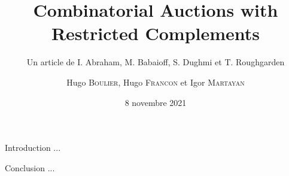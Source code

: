 \documentclass[aspectratio=169]{beamer}
\title{Combinatorial Auctions with Restricted Complements}
\subtitle{Un article de I. Abraham, M. Babaioff, S. Dughmi et T. Roughgarden}
\author{Hugo \textsc{Boulier}, Hugo \textsc{Francon} et Igor \textsc{Martayan}}
\date{8 novembre 2021}
\begin{document}
{\maketitle}

\begin{frame}{Introduction}
    ...
\end{frame}

\begin{frame}{Conclusion}
    ...
\end{frame}

\end{document}

